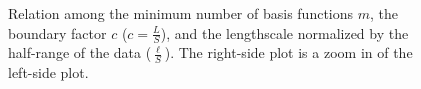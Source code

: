 \documentclass[]{interact}
\theoremstyle{plain}%
\theoremstyle{definition}
\theoremstyle{remark}
\begin{document}
\begin{figure}
\centering
{}
\hspace{3mm}
\caption{Relation among the minimum number of basis functions $m$, the boundary factor $c$ ($c = \frac{L}{S}$), and the lengthscale normalized by the half-range of the data ($\frac{\ell}{S}$). The right-side plot is a zoom in of the left-side plot.}
  \label{fig6_lscale_vs_J_vs_c}
\end{figure}
\end{document}
